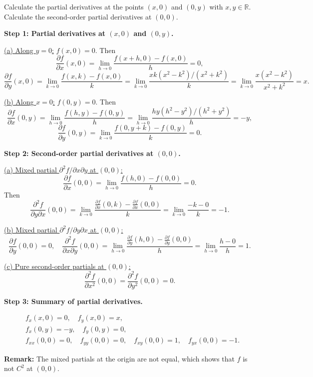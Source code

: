 \documentclass[12pt]{article}
\begin{document}
Calculate the partial derivatives at the points $(x, 0)$ and $(0, y)$ with $x, y \in \mathbb{R}$. Calculate the second-order partial derivatives at $(0, 0)$.

\begin{correctionbox}
\textbf{Step 1: Partial derivatives at \((x,0)\) and \((0,y)\).}

\underline{(a) Along \(y=0\):} \(f(x,0)=0\). Then
\[
\frac{\partial f}{\partial x}(x,0) = \lim_{h\to0} \frac{f(x+h,0)-f(x,0)}{h} = 0,
\]
\[
\frac{\partial f}{\partial y}(x,0) = \lim_{k\to0} \frac{f(x,k)-f(x,0)}{k} = \lim_{k\to0} \frac{xk(x^2-k^2)/(x^2+k^2)}{k} = \lim_{k\to0} \frac{x(x^2-k^2)}{x^2+k^2} = x.
\]

\underline{(b) Along \(x=0\):} \(f(0,y)=0\). Then
\[
\frac{\partial f}{\partial x}(0,y) = \lim_{h\to0} \frac{f(h,y)-f(0,y)}{h} = \lim_{h\to0} \frac{hy(h^2-y^2)/(h^2+y^2)}{h} = -y,
\]
\[
\frac{\partial f}{\partial y}(0,y) = \lim_{k\to0} \frac{f(0,y+k)-f(0,y)}{k} = 0.
\]

\medskip
\textbf{Step 2: Second-order partial derivatives at \((0,0)\).}

\underline{(a) Mixed partial \(\partial^2 f/\partial x \partial y\) at \((0,0)\):}
\[
\frac{\partial f}{\partial x}(0,0) = \lim_{h\to0} \frac{f(h,0)-f(0,0)}{h} = 0.
\]
Then
\[
\frac{\partial^2 f}{\partial y \partial x}(0,0) = \lim_{k\to0} \frac{\frac{\partial f}{\partial x}(0,k)-\frac{\partial f}{\partial x}(0,0)}{k} = \lim_{k\to0} \frac{-k-0}{k} = -1.
\]

\underline{(b) Mixed partial \(\partial^2 f/\partial y \partial x\) at \((0,0)\):}
\[
\frac{\partial f}{\partial y}(0,0) = 0,\quad 
\frac{\partial^2 f}{\partial x \partial y}(0,0) = \lim_{h\to0} \frac{\frac{\partial f}{\partial y}(h,0)-\frac{\partial f}{\partial y}(0,0)}{h} = \lim_{h\to0} \frac{h-0}{h} = 1.
\]

\medskip
\underline{(c) Pure second-order partials at \((0,0)\):}
\[
\frac{\partial^2 f}{\partial x^2}(0,0) = \frac{\partial^2 f}{\partial y^2}(0,0) = 0.
\]

\medskip
\textbf{Step 3: Summary of partial derivatives.}

\[
\begin{aligned}
&f_x(x,0)=0,\quad f_y(x,0)=x,\\
&f_x(0,y)=-y,\quad f_y(0,y)=0,\\
&f_{xx}(0,0)=0,\quad f_{yy}(0,0)=0,\quad f_{xy}(0,0)=1,\quad f_{yx}(0,0)=-1.
\end{aligned}
\]

\medskip
\textbf{Remark:} The mixed partials at the origin are not equal, which shows that \(f\) is not \(C^2\) at \((0,0)\).
\end{correctionbox}
\end{document}
